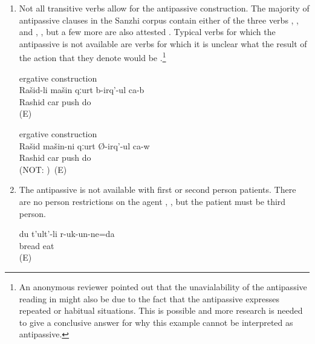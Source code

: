 \begin{enumerate}
	\item	Not all transitive verbs allow for the antipassive construction. The majority of antipassive clauses in the Sanzhi corpus contain either of the three verbs   ,   , and   , , but a few more are also attested . Typical verbs for which the antipassive is not available are verbs for which it is unclear what the result of the action that they denote would be .\footnote{An anonymous reviewer pointed out that the unavialability of the antipassive reading in  might also be due to the fact that the antipassive expresses repeated or habitual situations. This is possible and more research is needed to give a conclusive answer for why this example cannot be interpreted as antipassive.} 
	\begin{exe}
		\ex	\label{ex:Rashid get away from the car@64}
		\begin{xlist}
			\ex	ergative construction \label{ex:Rashid is pushing the car@64a} \\
			\gll	Rašid-li	mašin	qːurt	b-irq'-ul ca-b\\
				Rashid	car	push	do \\
			\glt	{} (E)
	
			\ex	ergative construction \label{ex:The car is pushing Rashid@64b} \\
			\gll	Rašid	mašin-ni	qːurt	Ø-irq'-ul ca-w\\
				Rashid	car	push	do \\
			\glt	{} (NOT: )~(E)
		\end{xlist}
	\end{exe}

	\item	The antipassive is not available with first or second person patients. There are no person restrictions on the agent , , but the patient must be third person.
	\begin{exe}
		\ex	\label{ex:I (fem.) am eating bread}
		\gll	du	t'ult'-li	r-uk-un-ne=da\\
				bread	eat\tsc{.ipfv-pret-cvb=1}\\
		\glt	\sqt{I (fem.) am eating bread.} (E)
	\end{exe}


\end{enumerate}
